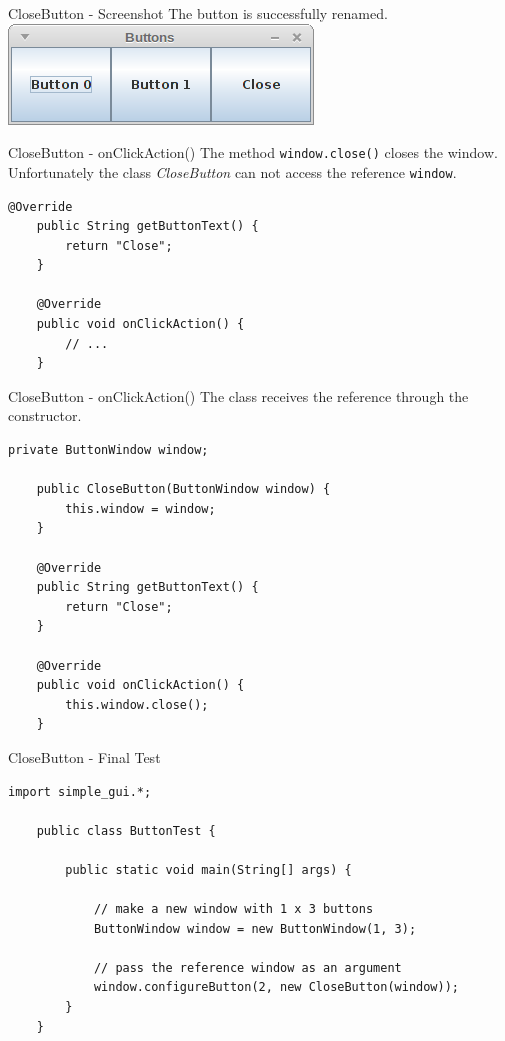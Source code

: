 \begin{frame}{CloseButton - Screenshot}
	The button is successfully renamed.
	\vfill
	\includegraphics[scale=0.4]{res/gui_close.png}
\end{frame}

\begin{frame}[fragile]{CloseButton - onClickAction()}
	The method \texttt{window.close()} closes the window. 
	Unfortunately the class \emph{CloseButton} can not access the reference \texttt{window}.
	\begin{lstlisting}[basicstyle=\ttfamily\scriptsize, escapechar=!]
	@Override
	public String getButtonText() {
	    return "Close";
	}

	@Override
	public void onClickAction() {
	    // ...
	}
	\end{lstlisting}
\end{frame}

\begin{frame}[fragile]{CloseButton - onClickAction()}
	The class receives the reference through the constructor.
	\begin{lstlisting}[basicstyle=\ttfamily\scriptsize, escapechar=!]
	private ButtonWindow window;
	
	public CloseButton(ButtonWindow window) {
	    this.window = window;
	}
	
	@Override
	public String getButtonText() {
	    return "Close";
	}

	@Override
	public void onClickAction() {
	    this.window.close();
	}
	\end{lstlisting}
\end{frame}

\begin{frame}[fragile]{CloseButton - Final Test}
	\begin{lstlisting}[basicstyle=\ttfamily\scriptsize]
	import simple_gui.*;

	public class ButtonTest {

	    public static void main(String[] args) {
		
	        // make a new window with 1 x 3 buttons
	        ButtonWindow window = new ButtonWindow(1, 3);
	        
	        // pass the reference window as an argument
	        window.configureButton(2, new CloseButton(window));
	    }
	}	
	\end{lstlisting}
\end{frame}

